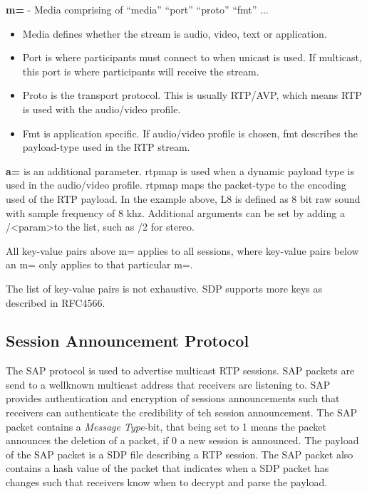 \textbf{m=} - Media comprising of ``media'' ``port'' ``proto'' ``fmt'' ...
\begin{itemize}
	\item Media defines whether the stream is audio, video, text or application.
	\item Port is where participants must connect to when unicast is used. If multicast, this port is where participants will receive the stream.
	\item Proto is the transport protocol. This is usually RTP/AVP, which means RTP is used with the audio/video profile.
	\item Fmt is application specific. If audio/video profile is chosen, fmt describes the payload-type used in the RTP stream.
\end{itemize}
\textbf{a=} is an additional parameter. rtpmap is used when a dynamic payload type is used in the audio/video profile. rtpmap maps the packet-type to the encoding used of the RTP payload. In the example above, L8 is defined as 8 bit raw sound with sample frequency of 8 khz. Additional arguments can be set by adding a /\textless param\textgreater to the list, such as /2 for stereo.

All key-value pairs above m= applies to all sessions, where key-value pairs below an m= only applies to that particular m=. 

The list of key-value pairs is not exhaustive. SDP supports more keys as described in RFC4566.


\subsection{Session Announcement Protocol} \label{sec:design:sap}
The \ac{SAP} protocol is used to advertise multicast RTP sessions. SAP packets are send to a wellknown multicast address that receivers are listening to. SAP provides authentication and encryption of sessions announcements such that receivers can authenticate the credibility of teh session announcement. The SAP packet contains a \textit{Message Type}-bit, that being set to 1 means the packet announces the deletion of a packet, if 0 a new session is announced. The payload of the SAP packet is a SDP file describing a RTP session. The SAP packet also contains a hash value of the packet that indicates when a SDP packet has changes such that receivers know when to decrypt and parse the payload. \citep{RFC2974}


